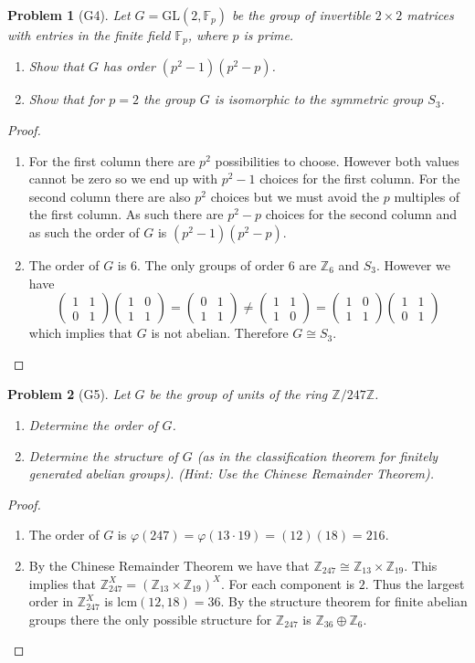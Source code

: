 \documentclass[10pt]{article}
\newcommand{\sk}{\vskip 10mm}
\newcommand{\bb}[1]{\mathbb{#1}}
\newcommand{\mm}[4]{\left(\begin{array}{cc}  #1 &  #2 \\ #3 & #4\end{array}\right)}
\theoremstyle{plain}
\newtheorem{problem}{Problem}
\theoremstyle{remark}
\begin{document}
\sk


\begin{problem}[G4]
  Let $G=\text{GL}(2,\bb{F}_p)$ be the group of invertible $2\times 2$ matrices
  with entries in the finite field $\bb{F}_p$, where $p$ is prime.
  \begin{enumerate}
  \item Show that $G$ has order $(p^2-1)(p^2-p)$.
  \item Show that for $p=2$ the group $G$ is isomorphic to the symmetric group
    $S_3$.
  \end{enumerate}
\end{problem}

\begin{proof}
  \begin{enumerate}
  \item For the first column there are $p^2$  possibilities to choose. However
    both values cannot be zero so we end up with $p^2-1$ choices for
    the first column. For the second column there are also $p^2$ choices
    but we must avoid the $p$ multiples of the first column.  As such
    there are $p^2-p$ choices for the second column and as such
    the order of $G$ is $(p^2-1)(p^2-p)$.
  \item The order of $G$ is 6. The only groups of order 6 are
    $\bb{Z}_6$ and $S_3$. However  we have
    \[ \mm{1}{1}{0}{1}\mm{1}{0}{1}{1}=\mm{0}{1}{1}{1}\neq \mm{1}{1}{1}{0}=\mm{1}{0}{1}{1} \mm{1}{1}{0}{1} \]
    which implies that $G$ is not abelian. Therefore $G\cong S_3$.
  \end{enumerate}
\end{proof}

\sk


\begin{problem}[G5]
  Let $G$ be the group of units of the ring $\bb{Z}/247\bb{Z}$.
  \begin{enumerate}
  \item Determine the order of $G$.
  \item Determine the structure of $G$ (as in the classification theorem for
    finitely generated abelian groups).
    (Hint: Use the Chinese Remainder Theorem).
  \end{enumerate}
\end{problem}

\begin{proof}
  \begin{enumerate}
  \item The order of $G$ is $\varphi(247)=\varphi(13\cdot 19)=(12)(18)=216$.
  \item By the Chinese Remainder Theorem we have that $\bb{Z}_{247}\cong\bb{Z}_{13}\times\bb{Z}_{19}$.
    This implies that $\bb{Z}_{247}^X=(\bb{Z}_{13}\times\bb{Z}_{19})^X$. For each component is
    $2$. Thus the largest order in $\bb{Z}_{247}^X$ is $\text{lcm}(12,18)=36$. By the
    structure theorem for finite abelian groups there the only possible structure for
    $\bb{Z}_{247}$ is $\bb{Z}_{36}\oplus\bb{Z}_6$.
  \end{enumerate}
\end{proof}
\end{document}
